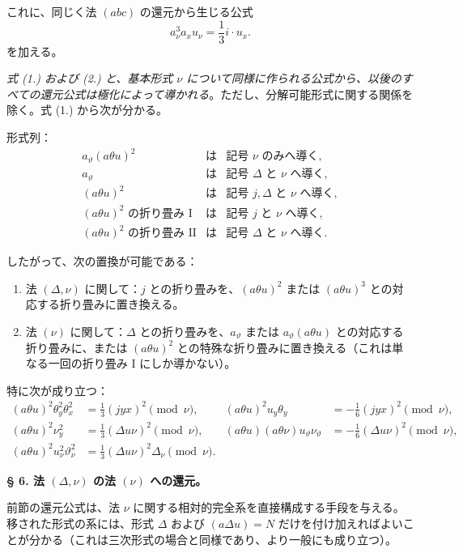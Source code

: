 \documentclass[11pt]{jlreq}
\newcommand{\A}{\Delta}
\begin{document}
これに、同じく法 $(abc)$ の還元から生じる公式
\[
a_\nu^3a_xu_\nu=\frac13 i\cdot u_x. \tag{2}
\]
を加える。

\emph{式 (1.) および (2.) と、基本形式 $\nu$ について同様に作られる公式から、以後のすべての還元公式は極化によって導かれる}。ただし、分解可能形式に関する関係を除く。式 (1.) から次が分かる。

形式列：
\[
\begin{array}{rcl}
a_\vartheta(a\theta u)^2 &\text{は}& \text{記号 }\nu\text{ のみへ導く},\\[0.2em]
a_\vartheta &\text{は}& \text{記号 }\A\text{ と }\nu\text{ へ導く},\\[0.2em]
(a\theta u)^2 &\text{は}& \text{記号 }j,\A\text{ と }\nu\text{ へ導く},\\[0.2em]
(a\theta u)^2\text{ の折り畳み I} &\text{は}& \text{記号 }j\text{ と }\nu\text{ へ導く},\\[0.2em]
(a\theta u)^2\text{ の折り畳み II} &\text{は}& \text{記号 }\A\text{ と }\nu\text{ へ導く}.
\end{array}
\]

したがって、次の置換が可能である：
\begin{enumerate}
\item 法 $(\A,\nu)$ に関して：$j$ との折り畳みを、$(a\theta u)^2$ または $(a\theta u)^3$ との対応する折り畳みに置き換える。
\item 法 $(\nu)$ に関して：$\A$ との折り畳みを、$a_\vartheta$ または $a_\vartheta(a\theta u)$ との対応する折り畳みに、または $(a\theta u)^2$ との特殊な折り畳みに置き換える（これは単なる一回の折り畳み I にしか導かない）。
\end{enumerate}
特に次が成り立つ：
\[
\begin{aligned}
(a\theta u)^2\theta_y^2\theta_x^2&=\frac13(jyx)^2\pmod{\nu},&
(a\theta u)^2u_y\theta_y&=-\frac16(jyx)^2\pmod{\nu},\\
(a\theta u)^2\nu_y^2&=\frac13(\A u\nu)^2\pmod{\nu},&
(a\theta u)(a\theta\nu)u_\vartheta\nu_\vartheta&=-\frac16(\A u\nu)^2\pmod{\nu},\\
(a\theta u)^2u_\nu^2\vartheta_\nu^2&=\frac13(\A u\nu)^2\A_\nu\pmod{\nu}.
\end{aligned}
\]

\begin{center}
\textbf{§ 6. \quad 法 $(\A,\nu)$ の法 $(\nu)$ への還元。}
\end{center}

前節の還元公式は、法 $\nu$ に関する相対的完全系を直接構成する手段を与える。移された形式の系には、形式 $\A$ および $(a\A u)=N$ だけを付け加えればよいことが分かる（これは三次形式の場合と同様であり、より一般にも成り立つ）。
\end{document}
